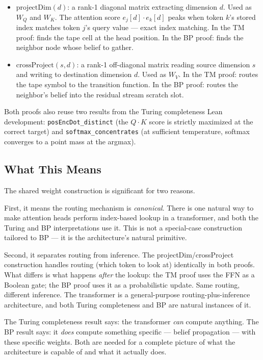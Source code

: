 \begin{itemize}
\item $\mathrm{projectDim}(d)$: a rank-1 diagonal matrix extracting dimension
$d$. Used as $W_Q$ and $W_K$. The attention score $e_j[d] \cdot e_k[d]$ peaks
when token $k$'s stored index matches token $j$'s query value --- exact index
matching. In the TM proof: finds the tape cell at the head position. In the BP
proof: finds the neighbor node whose belief to gather.

\item $\mathrm{crossProject}(s, d)$: a rank-1 off-diagonal matrix reading
source dimension $s$ and writing to destination dimension $d$. Used as $W_V$.
In the TM proof: routes the tape symbol to the transition function. In the BP
proof: routes the neighbor's belief into the residual stream scratch slot.
\end{itemize}

Both proofs also reuse two results from the Turing completeness Lean
development: \texttt{posEncDot\_distinct} (the $Q \cdot K$ score is strictly
maximized at the correct target) and \texttt{softmax\_concentrates} (at
sufficient temperature, softmax converges to a point mass at the argmax).

\subsection*{What This Means}

The shared weight construction is significant for two reasons.

First, it means the routing mechanism is \emph{canonical}. There is one natural
way to make attention heads perform index-based lookup in a transformer, and
both the Turing and BP interpretations use it. This is not a special-case
construction tailored to BP --- it is the architecture's natural primitive.

Second, it separates routing from inference. The projectDim/crossProject
construction handles routing (which token to look at) identically in both
proofs. What differs is what happens \emph{after} the lookup: the TM proof
uses the FFN as a Boolean gate; the BP proof uses it as a probabilistic
update. Same routing, different inference. The transformer is a general-purpose
routing-plus-inference architecture, and both Turing completeness and BP are
natural instances of it.

The Turing completeness result says: the transformer \emph{can} compute
anything. The BP result says: it \emph{does} compute something specific ---
belief propagation --- with these specific weights. Both are needed for a
complete picture of what the architecture is capable of and what it actually
does.


